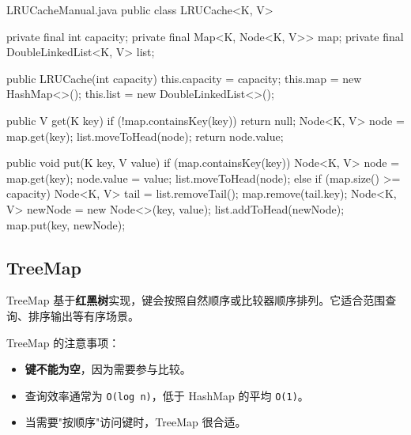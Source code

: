 
\begin{codeblock}[Java]{LRUCacheManual.java}
public class LRUCache<K, V> {
    private final int capacity;
    private final Map<K, Node<K, V>> map;
    private final DoubleLinkedList<K, V> list;

    public LRUCache(int capacity) {
        this.capacity = capacity;
        this.map = new HashMap<>();
        this.list = new DoubleLinkedList<>();
    }

    public V get(K key) {
        if (!map.containsKey(key)) return null;
        Node<K, V> node = map.get(key);
        list.moveToHead(node);
        return node.value;
    }

    public void put(K key, V value) {
        if (map.containsKey(key)) {
            Node<K, V> node = map.get(key);
            node.value = value;
            list.moveToHead(node);
        } else {
            if (map.size() >= capacity) {
                Node<K, V> tail = list.removeTail();
                map.remove(tail.key);
            }
            Node<K, V> newNode = new Node<>(key, value);
            list.addToHead(newNode);
            map.put(key, newNode);
        }
    }
}
\end{codeblock}

\subsection{TreeMap}
TreeMap 基于\textbf{红黑树}实现，键会按照自然顺序或比较器顺序排列。它适合范围查询、排序输出等有序场景。

TreeMap 的注意事项：

\begin{itemize}
    \item \textbf{键不能为空}，因为需要参与比较。
    \item 查询效率通常为 \texttt{O(log n)}，低于 HashMap 的平均 \texttt{O(1)}。
    \item 当需要"按顺序"访问键时，TreeMap 很合适。
\end{itemize}


